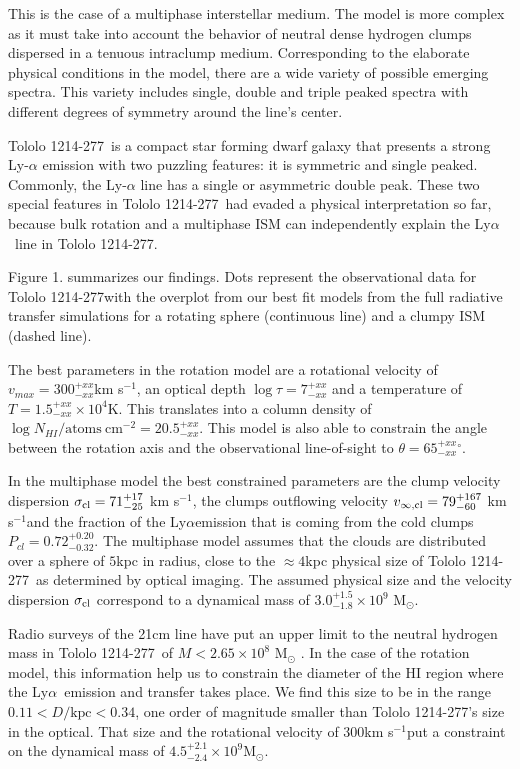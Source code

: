 \documentclass[a4paper, usenatbib, 12pt]{article}
\newcommand{\tol}{Tololo 1214-277}
\newcommand{\lya}{Ly$\alpha$}
\newcommand{\kms}{km s$^{-1}$}
\begin{document}
{This is the case of a multiphase interstellar medium.
The model is more complex as it must take into account the behavior
of neutral dense hydrogen clumps dispersed in a tenuous intraclump medium.  
Corresponding to the elaborate physical conditions in the model,
there are a wide variety of possible emerging spectra.
This variety includes single, double and triple peaked
spectra with different degrees of symmetry around the line's center.


\tol\ is a compact star forming dwarf galaxy that presents a
strong Ly-$\alpha$ emission \cite{Thuan97} with two puzzling 
features: it is symmetric and single peaked.
Commonly, the Ly-$\alpha$ line has a single or asymmetric double peak. 
These two special features in \tol\ had evaded a physical
interpretation so far, because bulk rotation and a multiphase ISM can
independently explain the \lya\ line in \tol. 

Figure 1. summarizes our findings.
Dots represent the observational data for \tol with the
overplot from our best fit models from the full radiative transfer
simulations for a rotating sphere (continuous line) and a clumpy ISM
(dashed line).

The best parameters in the rotation model are a rotational velocity of 
$v_{max}=300^{+xx}_{-xx}$\kms, an optical depth $\log\tau=7^{+xx}_{-xx}$ and a temperature
of $T=1.5^{+xx}_{-xx}\times 10^{4}$K. 
This translates into a column density of $\log N_{HI} /
\mathrm{atoms\ cm}^{-2} =  20.5^{+xx}_{-xx}$.  
This model is also able to constrain the angle between the rotation
axis and the observational line-of-sight to
$\theta=65^{+xx}_{-xx}$$^{\circ}$.  

In the multiphase model the best constrained parameters are
the clump velocity dispersion  $\sigma_{\rm{cl}}=71^{+17}_{-25}$ \kms,
the clumps outflowing velocity $v_{\infty, \rm{cl}}=79^{+167}_{-60}$
\kms and the fraction of the \lya emission that is  coming
from the cold clumps  
$P_{cl}=0.72^{+0.20}_{-0.32}$. 
The multiphase model assumes that the clouds are distributed over a
sphere of $5$kpc in radius, close to the $\approx 4$kpc physical size
of \tol\ as determined by optical imaging.
The assumed physical size and the velocity dispersion $\sigma_{\rm
  cl}$ correspond to a  dynamical mass of  $3.0^{+1.5}_{-1.8}\times
10^9$ M$_{\odot}$. 

Radio surveys of the 21cm line have put an upper limit to the neutral
hydrogen mass in \tol\ of $M<2.65\times 10^{8}$ M$_{\odot}$ \cite{pustilnikmartin07}. 
In the case of the rotation model, this information help us to constrain the
diameter of the HI region where the \lya\ emission and transfer takes
place. 
We find this size to be in the range $0.11 < D/\mathrm{kpc}<0.34$, one
order of magnitude smaller than \tol's size in the optical.   
That size and the rotational velocity of $300$\kms put a constraint on
the dynamical mass of $4.5^{+2.1}_{-2.4} \times 10^{9}$M$_{\odot}$.

}
\end{document}
